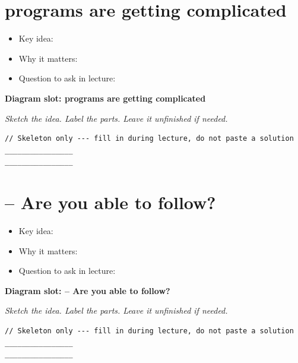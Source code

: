 \documentclass[12pt]{article}
\begin{document}
\section{programs are getting complicated}
\begin{itemize}[leftmargin=*]
  \item Key idea: \hrulefill
  \vspace{1.1em}
  \item Why it matters: \hrulefill
  \vspace{1.1em}
  \item Question to ask in lecture: \hrulefill
\end{itemize}
\noindent\textbf{Diagram slot: programs are getting complicated}
\begin{framed}
\begin{minipage}[t][0.22\textheight]{\textwidth}
\vspace{0.4em}
\textit{Sketch the idea. Label the parts. Leave it unfinished if needed.}
\end{minipage}
\end{framed}
\vspace{1em}
\begin{lstlisting}
// Skeleton only --- fill in during lecture, do not paste a solution
________________
________________
\end{lstlisting}
\vspace{1em}
\section{– Are you able to follow?}
\begin{itemize}[leftmargin=*]
  \item Key idea: \hrulefill
  \vspace{1.1em}
  \item Why it matters: \hrulefill
  \vspace{1.1em}
  \item Question to ask in lecture: \hrulefill
\end{itemize}
\noindent\textbf{Diagram slot: – Are you able to follow?}
\begin{framed}
\begin{minipage}[t][0.22\textheight]{\textwidth}
\vspace{0.4em}
\textit{Sketch the idea. Label the parts. Leave it unfinished if needed.}
\end{minipage}
\end{framed}
\vspace{1em}
\begin{lstlisting}
// Skeleton only --- fill in during lecture, do not paste a solution
________________
________________
\end{lstlisting}
\vspace{1em}
\end{document}
